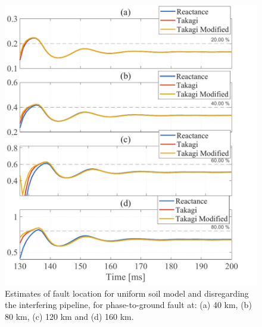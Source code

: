 \documentclass[conference]{IEEEtran}
\begin{document}
	\begin{figure}[!hbt]
		\begin{center}
			\includegraphics[width=1.1\columnwidth]{./fig/FaultInterfError2.pdf}
			\caption{Estimates of fault location for uniform soil model and disregarding the interfering pipeline, for phase-to-ground fault at: (a) 40 km, (b) 80 km, (c) 120 km and (d) 160 km.}
			\label{fig:ConvUniform_NoInterf}
		\end{center}
	\end{figure}
	
\end{document}
